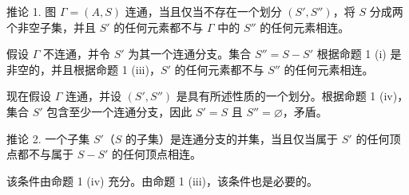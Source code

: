 推论 1. 图 \(\Gamma = (A, S)\) 连通，当且仅当不存在一个划分 \((S', S'')\)，将 \(S\) 分成两个非空子集，并且 \(S'\) 的任何元素都不与 \(\Gamma\) 中的 \(S''\) 的任何元素相连。

假设 \(\Gamma\) 不连通，并令 \(S'\) 为其一个连通分支。集合 \(S'' = S - S'\) 根据命题 1 (i) 是非空的，并且根据命题 1 (iii)，\(S'\) 的任何元素都不与 \(S''\) 的任何元素相连。

现在假设 \(\Gamma\) 连通，并设 \((S', S'')\) 是具有所述性质的一个划分。根据命题 1 (iv)，集合 \(S'\) 包含至少一个连通分支，因此 \(S' = S\) 且 \(S'' = \varnothing\)，矛盾。

推论 2. 一个子集 \(S'\)（\(S\) 的子集）是连通分支的并集，当且仅当属于 \(S'\) 的任何顶点都不与属于 \(S - S'\) 的任何顶点相连。

该条件由命题 1 (iv) 充分。由命题 1 (iii)，该条件也是必要的。

\relax{}
